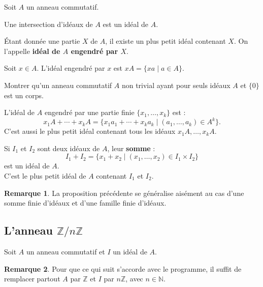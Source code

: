 \documentclass[french]{article}
\newcommand{\N}{\mathbb{N}}
\newcommand{\Z}{\mathbb{Z}}
\theoremstyle{plain}
\theoremstyle{definition}
\newtheorem*{rmq}{Remarque}
\theoremstyle{remark}
\begin{document}
Soit $A$ un anneau commutatif.

\begin{prop}%
	Une intersection d'idéaux de $A$ est un idéal de $A$.
\end{prop}

\begin{dfn}
	Étant donnée une partie $X$ de $A$, il existe un plus petit idéal contenant $X$. On l'appelle \textbf{idéal de $A$ engendré par $X$}.
\end{dfn}

\begin{prop}%
	Soit $x\in A$. L'idéal engendré par $x$ est $xA=\{xa\mid a\in A\}$.
\end{prop}

\begin{exo}
	Montrer qu'un anneau commutatif $A$ non trivial ayant pour seuls idéaux $A$ et $\{0\}$ est un corps. %
\end{exo}

\begin{prop}%
	L'idéal de $A$ engendré par une partie finie $\{x_1,\ldots,x_k\}$ est :
	$$x_1A+\cdots+x_kA=\{x_1a_1+\cdots+x_ka_k\mid (a_1,\ldots,a_k)\in A^k\}.$$
	C'est aussi le plus petit idéal contenant tous les idéaux $x_1A,\ldots,x_kA$.
\end{prop}

\begin{prop}[HP]%
	Si $I_1$ et $I_2$ sont deux idéaux de $A$, leur \textbf{somme} :
	$$I_1+I_2=\{x_1+x_2\mid (x_1,\ldots,x_2)\in I_1\times I_2\}$$ est un idéal de $A$.\\
	C'est le plus petit idéal de $A$ contenant $I_1$ et $I_2$.
\end{prop}

\begin{rmq}
	La proposition précédente se généralise aisément au cas d'une somme finie d'idéaux et d'une famille finie d'idéaux.
\end{rmq}

\subsection{L'anneau $\Z/n\Z$}

Soit $A$ un anneau commutatif et $I$ un idéal de $A$.

\begin{rmq}
	Pour que ce qui suit s'accorde avec le programme, il suffit de remplacer partout $A$ par $\Z$ et $I$ par $n\Z$, avec $n\in\N$.
\end{rmq}
\end{document}
